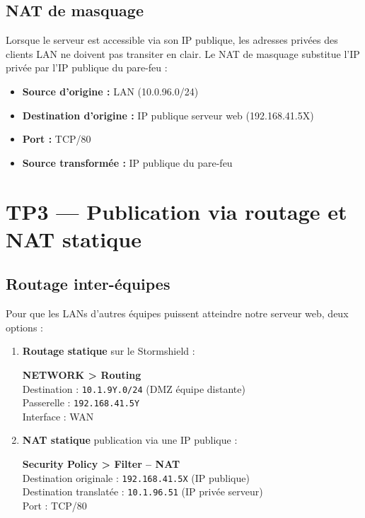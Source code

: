 \documentclass[11pt,a4paper]{article}
\begin{document}
\subsection{NAT de masquage}
Lorsque le serveur est accessible via son IP publique, les adresses privées des clients LAN ne doivent pas transiter en clair. Le NAT de masquage substitue l'IP privée par l'IP publique du pare-feu :

\begin{rulebox}[title={\faRandom~Règle NAT de masquage}]
\begin{itemize}
  \item \textbf{Source d'origine :} LAN (10.0.96.0/24)
  \item \textbf{Destination d'origine :} IP publique serveur web (192.168.41.5X)
  \item \textbf{Port :} TCP/80
  \item \textbf{Source transformée :} IP publique du pare-feu
\end{itemize}
\end{rulebox}

\section{TP3 — Publication via routage et NAT statique}

\subsection{Routage inter-équipes}
Pour que les LANs d'autres équipes puissent atteindre notre serveur web, deux options :
\begin{enumerate}
  \item \textbf{Routage statique} \textemdash{} sur le Stormshield :
  \begin{rulebox}
  \textbf{NETWORK > Routing} \\
  Destination : \texttt{10.1.9Y.0/24} (DMZ équipe distante) \\
  Passerelle : \texttt{192.168.41.5Y} \\
  Interface : WAN
  \end{rulebox}
  \item \textbf{NAT statique} \textemdash{} publication via une IP publique :
  \begin{rulebox}
  \textbf{Security Policy > Filter -- NAT} \\
  Destination originale : \texttt{192.168.41.5X} (IP publique) \\
  Destination translatée : \texttt{10.1.96.51} (IP privée serveur) \\
  Port : TCP/80
  \end{rulebox}
\end{enumerate}
\end{document}
